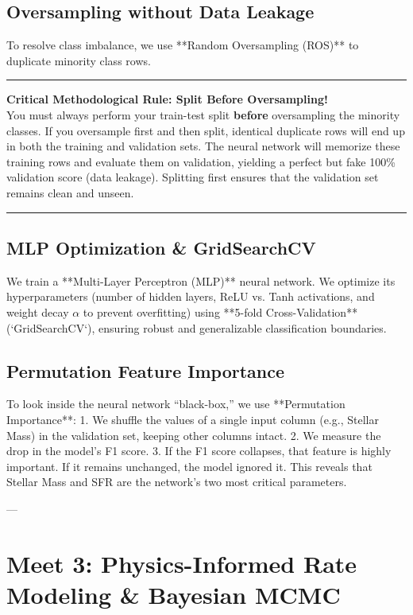 \documentclass[11pt,a4paper]{article}
\begin{document}
\subsection{Oversampling without Data Leakage}
To resolve class imbalance, we use **Random Oversampling (ROS)** to duplicate minority class rows. 
\begin{center}
\color{red}\hrule\vspace{2mm}
\textbf{Critical Methodological Rule: Split Before Oversampling!} \\
\color{black}\vspace{1mm}
You must always perform your train-test split \textbf{before} oversampling the minority classes. 
If you oversample first and then split, identical duplicate rows will end up in both the training and validation sets. The neural network will memorize these training rows and evaluate them on validation, yielding a perfect but fake 100\% validation score (data leakage). Splitting first ensures that the validation set remains clean and unseen.
\vspace{2mm}\color{red}\hrule\color{black}
\end{center}

\subsection{MLP Optimization \& GridSearchCV}
We train a **Multi-Layer Perceptron (MLP)** neural network. We optimize its hyperparameters (number of hidden layers, ReLU vs. Tanh activations, and weight decay $\alpha$ to prevent overfitting) using **5-fold Cross-Validation** (`GridSearchCV`), ensuring robust and generalizable classification boundaries.

\subsection{Permutation Feature Importance}
To look inside the neural network ``black-box,'' we use **Permutation Importance**:
1.  We shuffle the values of a single input column (e.g., Stellar Mass) in the validation set, keeping other columns intact.
2.  We measure the drop in the model's F1 score.
3.  If the F1 score collapses, that feature is highly important. If it remains unchanged, the model ignored it.
This reveals that Stellar Mass and SFR are the network's two most critical parameters.

---

\section{Meet 3: Physics-Informed Rate Modeling \& Bayesian MCMC}
\end{document}
